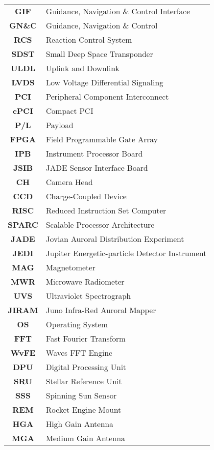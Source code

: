 \begin{multicols}{2}
{\begin{xltabular}{\linewidth}{c>{\raggedright\arraybackslash}X}
		\textbf{GIF} & Guidance, Navigation \& Control Interface \\
		\textbf{GN\&C} & Guidance, Navigation \& Control  \\
		\textbf{RCS} & Reaction Control System \\
		\textbf{SDST} & Small Deep Space Transponder \\
		\textbf{ULDL} & Uplink and Downlink \\
		\textbf{LVDS} & Low Voltage Differential Signaling \\
		\textbf{PCI} & Peripheral Component Interconnect \\
		\textbf{cPCI} & Compact PCI \\
		\textbf{P/L} & Payload \\
		\textbf{FPGA} & Field Programmable Gate Array \\
		\textbf{IPB} & Instrument Processor Board \\
		\textbf{JSIB} & JADE Sensor Interface Board \\
		\textbf{CH} & Camera Head \\
		\textbf{CCD} & Charge-Coupled Device \\
		\textbf{RISC} & Reduced Instruction Set Computer \\
		\textbf{SPARC} & Scalable Processor Architecture \\
		\textbf{JADE} & Jovian Auroral Distribution Experiment \\
		\textbf{JEDI} & Jupiter Energetic-particle Detector Instrument \\
		\textbf{MAG} & Magnetometer \\
		\textbf{MWR} & Microwave Radiometer \\
		\textbf{UVS} & Ultraviolet Spectrograph \\
		\textbf{JIRAM} & Juno Infra-Red Auroral Mapper \\
		\textbf{OS} & Operating System \\
		\textbf{FFT} & Fast Fourier Transform \\
		\textbf{WvFE} & Waves FFT Engine \\
		\textbf{DPU} & Digital Processing Unit \\
		\textbf{SRU} & Stellar Reference Unit \\
		\textbf{SSS} & Spinning Sun Sensor \\
		\textbf{REM} & Rocket Engine Mount \\
		\textbf{HGA} & High Gain Antenna \\
		\textbf{MGA} & Medium Gain Antenna \\

\end{xltabular}}
\end{multicols}
